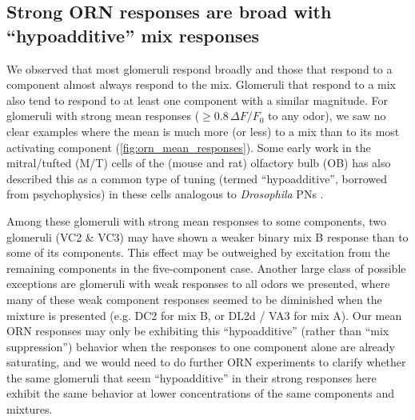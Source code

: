 \documentclass[12pt]{caltech_thesis}
\renewcommand{\cite}{{ }\autocite}
\let\Oldsubsection\subsection
\renewcommand{\subsection}{\FloatBarrier\Oldsubsection}
\newcommand{\DeltaFOverF}{\ensuremath{\Delta\text{$F$/$F_0$}}}
\begin{document}
\begin{refsection}
\subsection{Strong ORN responses are broad with ``hypoadditive'' mix responses}
We observed that most glomeruli respond broadly and those that respond to a component almost always respond to the mix.
Glomeruli that respond to a mix also tend to respond to at least one component with a similar magnitude.
For glomeruli with strong mean responses ($\geq\!0.8\,\DeltaFOverF$ to any odor), we saw no clear examples where the mean is much more (or less) to a mix than to its most activating component (\cref{fig:orn_mean_responses}).
Some early work in the mitral/tufted (M/T) cells of the (mouse and rat) olfactory bulb (OB) has also described this as a common type of tuning (termed ``hypoadditive'', borrowed from psychophysics) in these cells analogous to \textit{Drosophila} PNs\cite{Giraudet2002, DuchampViret2003, Davison2007}.

Among these glomeruli with strong mean responses to some components, two glomeruli (VC2 \& VC3) may have shown a weaker binary mix B response than to some of its components.
This effect may be outweighed by excitation from the remaining components in the five-component case.
Another large class of possible exceptions are glomeruli with weak responses to all odors we presented, where many of these weak component responses seemed to be diminished when the mixture is presented (e.g. DC2 for mix B, or DL2d / VA3 for mix A).
Our mean ORN responses may only be exhibiting this ``hypoadditive'' (rather than ``mix suppression'') behavior when the responses to one component alone are already saturating, and we would need to do further ORN experiments to clarify whether the same glomeruli that seem ``hypoadditive'' in their strong responses here exhibit the same behavior at lower concentrations of the same components and mixtures.


\end{refsection}
\end{document}

